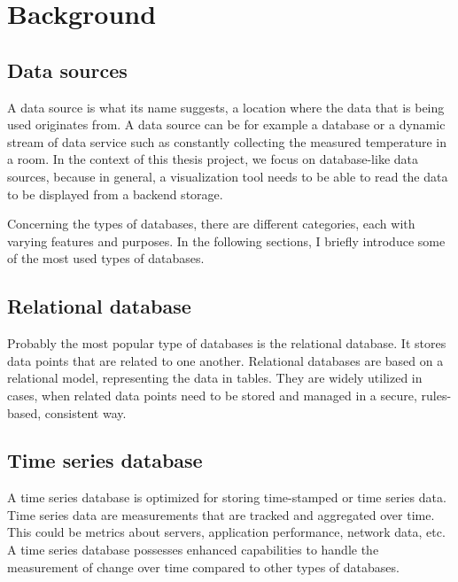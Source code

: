 \chapter{Background}

\section{Data sources}


A data source is what its name suggests, a location where the data that is being used originates from. A data source can be for example a database or a dynamic stream of data service such as constantly collecting the measured temperature in a room. In the context of this thesis project, we focus on database-like data sources, because in general, a visualization tool needs to be able to read the data to be displayed from a backend storage. \cite{talend-datasource} \cite{techopedia-datasource}

Concerning the types of databases, there are different categories, each with varying features and purposes. In the following sections, I briefly introduce some of the most used types of databases.

\section{Relational database}

Probably the most popular type of databases is the relational database. It stores data points that are related to one another. Relational databases are based on a relational model, representing the data in tables. They are widely utilized in cases, when related data points need to be stored and managed in a secure, rules-based, consistent way. \cite{relational-database-oracle}

\section{Time series database}


A time series database is optimized for storing time-stamped or time series data. Time series data are measurements that are tracked and aggregated over time. This could be metrics about servers, application performance, network data, etc. A time series database possesses enhanced capabilities to handle the measurement of change over time compared to other types of databases. \cite{timeseries-database-influxdata}

